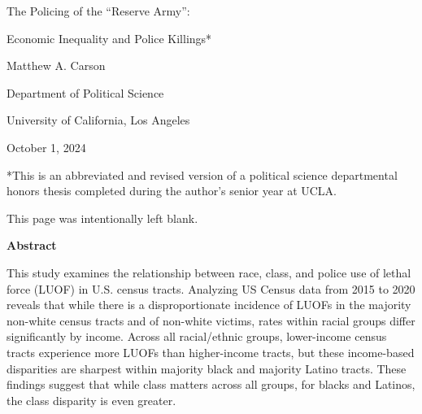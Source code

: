 \documentclass[12pt]{article}
\renewcommand{\headrulewidth}{1pt} %
\renewenvironment{abstract}
  {\par\noindent\centering\textbf{Abstract}\par}
  {\noindent\raggedright}
\begin{document}
\begin{titlepage}
  \thispagestyle{fancy}
  \renewcommand{\headrulewidth}{0pt} %
  {
  \centering
  \vspace*{2in}
  The Policing of the ``Reserve Army'':\par
  Economic Inequality and Police Killings*\par
  \vspace{1.2in}
  {Matthew A. Carson\par}
  \vspace{12pt}
  Department of Political Science\par
  University of California, Los Angeles\par
  \vspace{0.5in}
  {October 1, 2024\par}
  }
 \vfill
 \noindent{}*This is an abbreviated and revised version of a political science departmental honors thesis completed during the author's senior year at UCLA.
 \vspace{6pt}
\end{titlepage}

\thispagestyle{empty} %

\vspace*{\fill}
\hspace*{\fill}
\begin{center}
    \noindent{}This page was intentionally left blank.
\end{center}
\hspace*{\fill}
\vspace*{\fill}

\clearpage

\begin{abstract}
This study examines the relationship between race, class, and police use of lethal force (LUOF) in U.S. census tracts. Analyzing US Census data from 2015 to 2020 reveals that while there is a disproportionate incidence of LUOFs in the majority non-white census tracts and of non-white victims, rates within racial groups differ significantly by income. Across all racial/ethnic groups, lower-income census tracts experience more LUOFs than higher-income tracts, but these income-based disparities are sharpest within majority black and majority Latino tracts. These findings suggest that while class matters across all groups, for blacks and Latinos, the class disparity is even greater.
\end{abstract}
\end{document}
